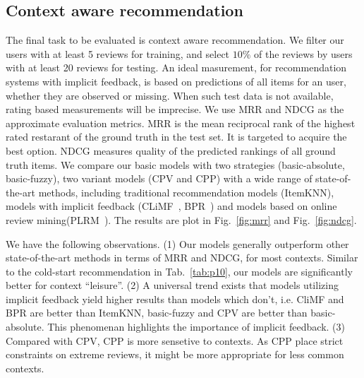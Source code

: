 \documentclass[preprint,12pt]{elsarticle}
\begin{document}
\subsection{Context aware recommendation}
The final task to be evaluated is context aware recommendation. We filter our users with at least 5 reviews for training, and select $10\%$ of the reviews by users with at least 20 reviews for testing. An ideal masurement, for recommendation systems with implicit feedback, is based on predictions of all items for an user, whether they are observed or missing. When such test data is not available, rating based measurements will be imprecise. We use MRR and NDCG as the approximate evaluation metrics. MRR is the mean reciprocal rank of the highest rated restarant of the ground truth in the test set. It is targeted to acquire the best option. NDCG measures quality of the predicted rankings of all ground truth items. We compare our basic models with two strategies (basic-absolute, basic-fuzzy), two variant models (CPV and CPP) with a wide range of state-of-the-art methods, including traditional recommendation models (ItemKNN), models with implicit feedback (CLiMF~\cite{Shi2012CLiMF}, BPR~\cite{Rendle2009BPR}) and models based on online review mining(PLRM~\cite{Li2010Contextual}). The results are plot in Fig.~\ref{fig:mrr} and Fig.~\ref{fig:ndcg}. 

We have the following observations. (1) Our models generally outperform other state-of-the-art methods in terms of MRR and NDCG, for most contexts. Similar to the cold-start recommendation in Tab.~\ref{tab:p10}, our models are significantly better for context ``leisure''. (2) A universal trend exists that models utilizing implicit feedback yield higher results than models which don't, i.e. CliMF and BPR are better than ItemKNN, basic-fuzzy and CPV are better than basic-absolute. This phenomenan highlights the importance of implicit feedback. (3) Compared with CPV, CPP is more sensetive to contexts. As CPP place strict constraints on extreme reviews, it might be more appropriate for less common contexts.   
\end{document}
